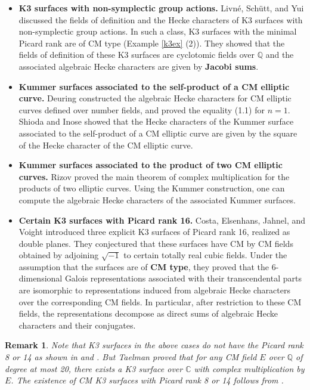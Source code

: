 \documentclass[reqno,a4paper,11pt]{amsart}
\newtheorem{rmk}[dfn]{Remark}
\theoremstyle{definition}
\theoremstyle{definition}
\begin{document}
\begin{itemize}
        
    \item{\textbf{K3 surfaces with non-symplectic group actions.} Livn\'e, Sch\"utt, and Yui \cite{yui} discussed the fields of definition and the Hecke characters of K3 surfaces with non-symplectic group actions. In such a class, K3 surfaces with the minimal Picard rank are of CM type (Example \ref{k3ex} (2)). They showed that the fields of definition of these K3 surfaces are cyclotomic fields over $\mathbb{Q}$ and the associated algebraic Hecke characters are given by \textbf{Jacobi sums}. }
    \item{\textbf{Kummer surfaces associated to the self-product of a CM elliptic curve.}} Deuring \cite{deu} constructed the algebraic Hecke characters for CM elliptic curves defined over number fields, and proved the equality (1.1) for $n=1$. Shioda and Inose \cite{si} showed that the Hecke characters of the Kummer surface associated to the self-product of a CM elliptic curve are given by the square of the Hecke character of the CM elliptic curve. 
    \item{\textbf{Kummer surfaces associated to the product of two CM elliptic curves.}} Rizov \cite{Rizov10} proved the main theorem of complex multiplication for the products of two elliptic curves. Using  the Kummer construction, one can compute the algebraic Hecke characters of the associated Kummer surfaces. 
    \item{\textbf{Certain K3 surfaces with Picard rank 16.}}
    Costa, Elsenhans, Jahnel, and  Voight \cite{costa} introduced  three explicit K3 surfaces  of Picard rank 16, realized  as double planes.  They conjectured that these surfaces have CM by CM fields  obtained by adjoining $\sqrt{-1}$ to certain totally real cubic fields.  Under the assumption  that the surfaces are of \textbf{CM type}, they proved that the 6-dimensional Galois representations associated with their transcendental parts are isomorphic to representations induced from algebraic Hecke characters over the corresponding CM fields. In particular, after restriction to these CM fields, the representations  decompose as  direct sums of algebraic Hecke characters and their conjugates. 
\end{itemize}
\begin{rmk}Note that K3 surfaces in the above  cases do not have the Picard rank 8 or 14 as shown in \cite[Theorem 1 and 2]{yui} and \cite[Corollary 2.3, Proposition 2.4, and Corollary 2.6]{hulek}. But Taelman \cite{tae} proved that  for any CM field $E$ over $\mathbb{Q}$ of degree at most 20, there exists a K3 surface over $\mathbb{C}$ with complex multiplication by $E$. The existence of CM K3 surfaces with Picard rank 8 or 14 follows from \cite{tae}. 
\end{rmk}
\end{document}
